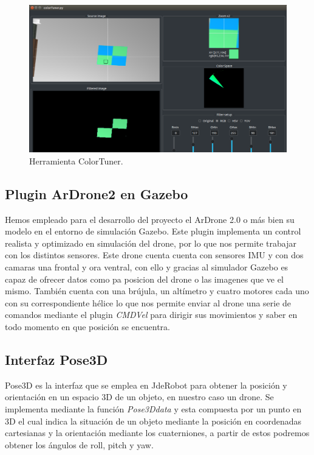 \begin{figure}[H]
	\begin{center}
		\includegraphics[width=1\textwidth]{imag/IMG27.png}
				\caption{Herramienta ColorTuner.} 
	\label{fig:ColorTuner.}	
	\end{center}
\end{figure}

\subsection{Plugin ArDrone2 en Gazebo}
\hspace{1cm} Hemos empleado para el desarrollo del proyecto el ArDrone 2.0 o más bien su modelo en el entorno de simulación Gazebo. Este plugin implementa un control realista y optimizado en simulación del drone, por lo que nos permite trabajar con los distintos sensores. Este drone cuenta cuenta con sensores IMU y con dos camaras una frontal y ora ventral, con ello y gracias al simulador Gazebo es capaz de ofrecer datos como pa posicion del drone o las imagenes que ve el mismo. También cuenta con una brújula, un altímetro y cuatro motores cada uno con su correspondiente hélice lo que nos permite enviar al drone una serie de comandos mediante el plugin \textit{CMDVel} para dirigir sus movimientos y saber en todo momento en que posición se encuentra.

\subsection{Interfaz Pose3D}
\hspace{1cm} Pose3D es la interfaz que se emplea en JdeRobot para obtener la posición y orientación en un espacio 3D de un objeto, en nuestro caso un drone. Se implementa mediante la función \emph{Pose3Ddata} y esta compuesta por un punto en 3D el cual indica la situación de un objeto mediante la posición en coordenadas cartesianas y la orientación mediante los cuaterniones, a partir de estos podremos obtener los ángulos de roll, pitch y yaw.

